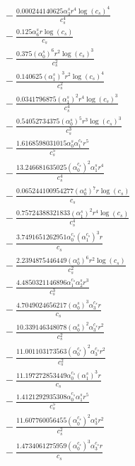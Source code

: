 \documentclass[10pt]{article}
\begin{document}
\begin{align*}
&{}  - \frac{0.000244140625 \alpha_{3}^s r^{4} \log{\left(c_{s} \right)}^{4}}{c_{s}^{4}} \\
&{}  - \frac{0.125 \alpha_{6}^s r \log{\left(c_{s} \right)}}{c_{s}} \\
&{}  - \frac{0.375 \left(\alpha_{0}^s\right)^{6} r^{2} \log{\left(c_{s} \right)}^{3}}{c_{s}^{2}} \\
&{}  - \frac{0.140625 \left(\alpha_{1}^s\right)^{3} r^{2} \log{\left(c_{s} \right)}^{4}}{c_{s}^{2}} \\
&{}  - \frac{0.0341796875 \left(\alpha_{1}^s\right)^{2} r^{4} \log{\left(c_{s} \right)}^{3}}{c_{s}^{4}} \\
&{}  - \frac{0.54052734375 \left(\alpha_{0}^s\right)^{5} r^{3} \log{\left(c_{s} \right)}^{3}}{c_{s}^{3}} \\
&{}  - \frac{1.6168598031015 \alpha_{0}^s \alpha_{1}^{c_s} r^{5}}{c_{s}^{5}} \\
&{}  - \frac{13.246681635025 \left(\alpha_{0}^{c_s}\right)^{2} \alpha_{1}^s r^{4}}{c_{s}^{4}} \\
&{}  - \frac{0.065244100954277 \left(\alpha_{0}^s\right)^{7} r \log{\left(c_{s} \right)}}{c_{s}} \\
&{}  - \frac{0.75724388321833 \left(\alpha_{1}^s\right)^{2} r^{4} \log{\left(c_{s} \right)}}{c_{s}^{4}} \\
&{}  - \frac{3.7491651262951 \alpha_{0}^{c_s} \left(\alpha_{1}^{c_s}\right)^{3} r}{c_{s}} \\
&{}  - \frac{2.2394875446449 \left(\alpha_{0}^s\right)^{6} r^{2} \log{\left(c_{s} \right)}}{c_{s}^{2}} \\
&{}  - \frac{4.4850321146896 \alpha_{1}^{c_s} \alpha_{2}^s r^{3}}{c_{s}^{3}} \\
&{}  - \frac{4.7049024656217 \left(\alpha_{0}^s\right)^{3} \alpha_{3}^{c_s} r}{c_{s}} \\
&{}  - \frac{10.339146348078 \left(\alpha_{0}^s\right)^{2} \alpha_{3}^{c_s} r^{2}}{c_{s}^{2}} \\
&{}  - \frac{11.001103173563 \left(\alpha_{0}^{c_s}\right)^{2} \alpha_{3}^{c_s} r^{2}}{c_{s}^{2}} \\
&{}  - \frac{11.197272853449 \alpha_{0}^{c_s} \left(\alpha_{1}^s\right)^{3} r}{c_{s}} \\
&{}  - \frac{1.4121292935308 \alpha_{0}^{c_s} \alpha_{1}^s r^{5}}{c_{s}^{5}} \\
&{}  - \frac{11.607760056455 \left(\alpha_{0}^{c_s}\right)^{2} \alpha_{3}^s r^{2}}{c_{s}^{2}} \\
&{}  - \frac{1.4734061275959 \left(\alpha_{0}^{c_s}\right)^{3} \alpha_{3}^{c_s} r}{c_{s}} \\

\end{align*}
\end{document}
